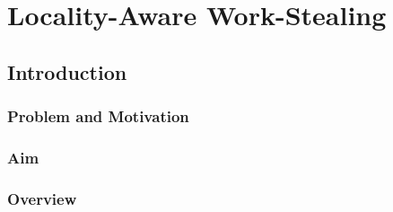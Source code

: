 
\part{Locality-Aware Work-Stealing}
\label{part:locality}

\chapter{Introduction}
\label{chap:locality-introduction}

\section{Problem and Motivation}
\label{sec:locality-intro-problem-and-motivation}


\section{Aim}
\label{sec:locality-intro-aim}


\section{Overview}
\label{sec:locality-intro-overview}


